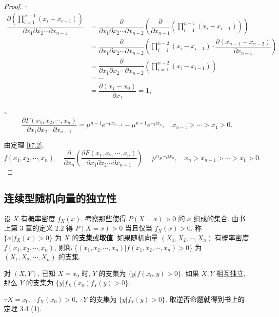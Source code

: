 \documentclass[color=black,device=normal,lang=cn]{elegantnote}
\numberwithin{equation}{section}
\theoremstyle{plain}
\numberwithin{exercise}{exsection}
\begin{document}
\begin{proof}
    $\because$
    \begin{align*}
        \dfrac{\partial\left(\prod\limits_{i=1}^{n-1}(x_i-x_{i-1})\right)}{\partial x_1\partial x_2\cdots\partial x_{n-1}} & =\dfrac{\partial}{\partial x_1\partial x_2\cdots\partial x_{n-2}}\left(\dfrac{\partial}{\partial x_{n-1}}\left(\prod\limits_{i=1}^{n-1}(x_i-x_{i-1})\right)\right) \\
        & =\dfrac{\partial}{\partial x_1\partial x_2\cdots\partial x_{n-2}}\left(\prod\limits_{i=1}^{n-2}(x_i-x_{i-1})\cdot\dfrac{\partial(x_{n-1}-x_{n-2})}{\partial x_{n-1}}\right) \\
        & =\dfrac{\partial}{\partial x_1\partial x_2\cdots\partial x_{n-2}}\left(\prod\limits_{i=1}^{n-2}(x_i-x_{i-1})\right) \\
        & =\cdots \\
        & =\dfrac{\partial(x_1-x_0)}{\partial x_1}=1,
    \end{align*}

    $\therefore$
    \[\dfrac{\partial F(x_1,x_2,\cdots,x_n)}{\partial x_1\partial x_2\cdots\partial x_{n-1}}=\mu^{n-1}e^{-\mu x_{n-1}}-\mu^{n-1}e^{-\mu x_n},\quad x_{n-1}>\cdots>x_1>0.\]

    由定理 \ref{t7.2},
    \[f(x_1,x_2,\cdots,x_n)=\dfrac{\partial}{\partial x_n}\left(\dfrac{\partial F(x_1,x_2,\cdots,x_n)}{\partial x_1\partial x_2\cdots\partial x_{n-1}}\right)=\mu^ne^{-\mu x_n},\quad x_n>x_{n-1}>\cdots>x_1>0.\]
\end{proof}
\subsection{连续型随机向量的独立性}
设 $X$ 有概率密度 $f_X(x)$. 考察那些使得 $P(X=x)>0$ 的 $x$ 组成的集合. 由书上第 3 章的定义 2.2 得 $P(X=x)>0$ 当且仅当 $f_X(x)>0$. 称 $\{x|f_X(x)>0\}$ 为 $X$ 的\textbf{支集}或\textbf{取值}. 如果随机向量 $(X_1,X_2,\cdots,X_n)$ 有概率密度 $f(x_1,x_2,\cdots,x_n)$, 则称 $\{(x_1,x_2,\cdots,x_n)|f(x_1,x_2,\cdots,x_n)>0\}$ 为 $(X_1,X_2,\cdots,X_n)$ 的支集.

对 $(X,Y)$, 已知 $X=x_0$ 时, $Y$ 的支集为 $\{y|f(x_0,y)>0\}$. 如果 $X,Y$ 相互独立, 那么 $Y$ 的支集为 $\{y|f_X(x_0)f_Y(y)>0\}$.

$\because X=x_0$, $\therefore f_X(x_0)>0$, $\therefore Y$ 的支集为 $\{y|f_Y(y)>0\}$. 取逆否命题就得到书上的定理 3.4 (1).
\end{document}
